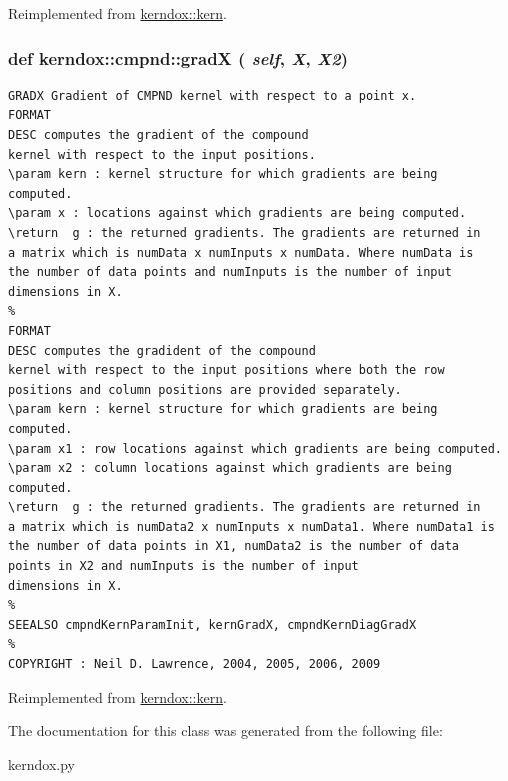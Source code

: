 Reimplemented from \hyperlink{classkerndox_1_1kern}{kerndox::kern}.\hypertarget{classkerndox_1_1cmpnd_64fb3d184567fe23f6dd7be1797e8a05}{
\subsubsection[{gradX}]{\setlength{\rightskip}{0pt plus 5cm}def kerndox::cmpnd::gradX ( {\em self}, \/   {\em X}, \/   {\em X2})}}
\label{classkerndox_1_1cmpnd_64fb3d184567fe23f6dd7be1797e8a05}




\footnotesize\begin{verbatim}GRADX Gradient of CMPND kernel with respect to a point x.
FORMAT
DESC computes the gradient of the compound
kernel with respect to the input positions. 
\param kern : kernel structure for which gradients are being
computed.
\param x : locations against which gradients are being computed.
\return  g : the returned gradients. The gradients are returned in
a matrix which is numData x numInputs x numData. Where numData is
the number of data points and numInputs is the number of input
dimensions in X.
%
FORMAT
DESC computes the gradident of the compound
kernel with respect to the input positions where both the row
positions and column positions are provided separately.
\param kern : kernel structure for which gradients are being
computed.
\param x1 : row locations against which gradients are being computed.
\param x2 : column locations against which gradients are being computed.
\return  g : the returned gradients. The gradients are returned in
a matrix which is numData2 x numInputs x numData1. Where numData1 is
the number of data points in X1, numData2 is the number of data
points in X2 and numInputs is the number of input
dimensions in X.
%
SEEALSO cmpndKernParamInit, kernGradX, cmpndKernDiagGradX
%
COPYRIGHT : Neil D. Lawrence, 2004, 2005, 2006, 2009

\end{verbatim}
\normalsize
 

Reimplemented from \hyperlink{classkerndox_1_1kern}{kerndox::kern}.

The documentation for this class was generated from the following file:\begin{CompactItemize}
\item 
kerndox.py\end{CompactItemize}
